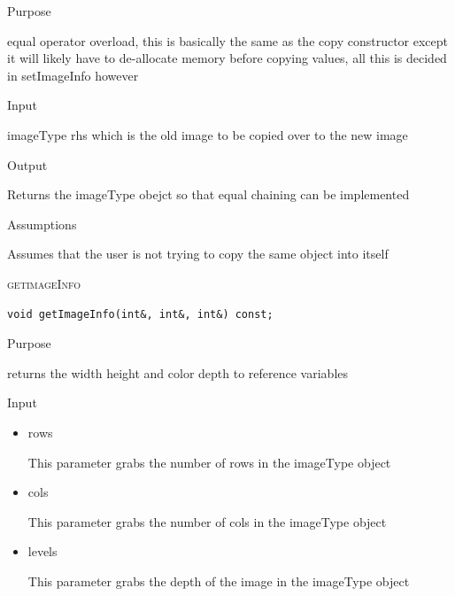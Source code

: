 \documentclass[pdftex, 11pt]{article}
\begin{document}
\begin{description}
\begin{description}
			\item{Purpose}

				equal operator overload, this is basically
				the same as the copy constructor
				except it will likely have to 
				de-allocate memory before copying values, all
				this is decided in setImageInfo however

			\item{Input}

				imageType rhs which is the old image to be 
				copied over to the new image

			\item{Output}

				Returns the imageType obejct so that
				equal chaining can be implemented


			\item{Assumptions}

				Assumes that the user is not trying to copy the same
				object into itself


		\end{description}


	\item{\textsc{getimageInfo}}
		\begin{description}

\begin{lstlisting}
void getImageInfo(int&, int&, int&) const;
\end{lstlisting}

			\item{Purpose}
			
 				returns the width height and color depth 
				to reference variables

			\item{Input}

				\begin{itemize}
					\item{rows}

						This parameter grabs the number of rows
						in the imageType object

					\item{cols}

						This parameter grabs the number of cols
						in the imageType object

					\item{levels}

						This parameter grabs the depth of the
						image in the imageType object

				\end{itemize}


\end{description}
\end{description}
\end{document}
